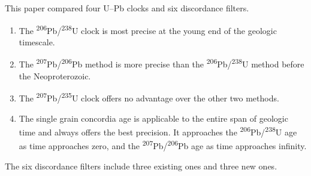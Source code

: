 \documentclass[gchron, manuscript]{copernicus}
\begin{document}
This paper compared four U--Pb clocks and six discordance filters.

\begin{enumerate}
  \item The \textsuperscript{206}Pb/\textsuperscript{238}U clock is
    most precise at the young end of the geologic timescale.
  \item The \textsuperscript{207}Pb/\textsuperscript{206}Pb method is
    more precise than the
    \textsuperscript{206}Pb/\textsuperscript{238}U method before the
    Neoproterozoic.
  \item The \textsuperscript{207}Pb/\textsuperscript{235}U clock
    offers no advantage over the other two methods.
  \item The single grain concordia age is applicable to the entire
    span of geologic time and always offers the best precision. It
    approaches the \textsuperscript{206}Pb/\textsuperscript{238}U age
    as time approaches zero, and the
    \textsuperscript{207}Pb/\textsuperscript{206}Pb age as time
    approaches infinity.
\end{enumerate}

\noindent The six discordance filters include three existing ones and
three new ones.
\end{document}
